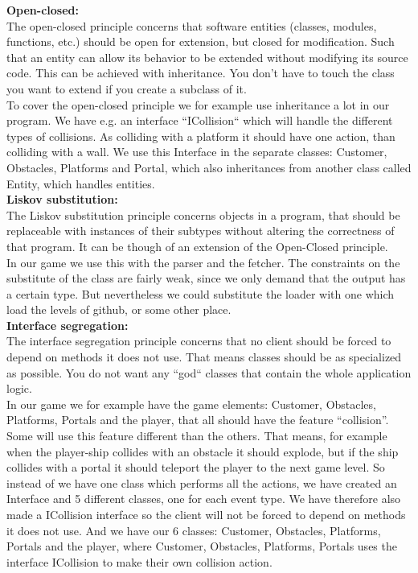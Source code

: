 \documentclass[../master.tex]{subfiles}
\begin{document}
\noindent\textbf{Open-closed:}\\
The open-closed principle concerns that software entities (classes, modules, functions, etc.) should be open for extension, but closed for modification. Such that an entity can allow its behavior to be extended without modifying its source code. This can be achieved with inheritance. You don’t have to touch the class you want to extend if you create a subclass of it.\\

\noindent To cover the open-closed principle we for example use inheritance a lot in our program. We have e.g. an interface ``ICollision`` which will handle the different types of collisions. As colliding with a platform it should have one action, than colliding with a wall. We use this Interface in the separate classes: Customer, Obstacles, Platforms and Portal, which also inheritances from another class called Entity, which handles entities.\\

\noindent\textbf{Liskov substitution:}\\
The Liskov substitution principle concerns objects in a program, that should be replaceable with instances of their subtypes without altering the correctness of that program. It can be though of an extension of the Open-Closed principle.  
\\

\noindent In our game we use this with the parser and the fetcher. The constraints on the substitute of the class are fairly weak, since we only demand that the output has a certain type. But nevertheless we could substitute the loader with one which load the levels of github, or some other place.
\\

\noindent\textbf{Interface segregation:}\\
The interface segregation principle concerns that no client should be forced to depend on methods it does not use. That means classes should be as specialized as possible. You do not want any ``god`` classes that contain the whole application logic.\\

\noindent In our game we for example have the game elements: Customer, Obstacles, Platforms, Portals and the player, that all should have the feature ``collision''. Some will use this feature different than the others. That means, for example when the player-ship collides with an obstacle it should explode, but if the ship collides with a portal it should teleport the player to the next game level. So instead of we have one class which performs all the actions, we have created an Interface and 5 different classes, one for each event type. We have therefore also made a ICollision interface so the client will not be forced to depend on methods it does not use. And we have our 6 classes: Customer, Obstacles, Platforms, Portals and the player, where Customer, Obstacles, Platforms, Portals uses the interface ICollision to make their own collision action.\\
\end{document}
